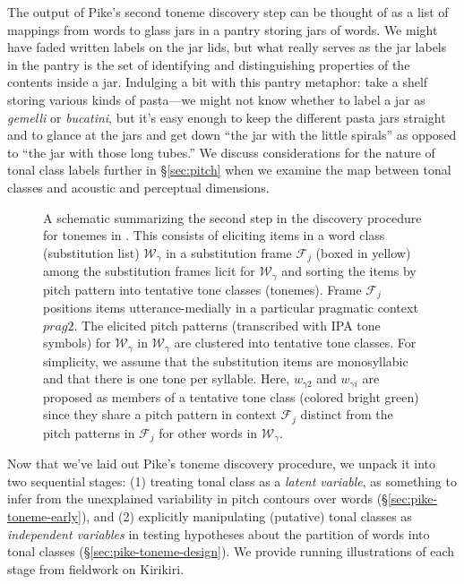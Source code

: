 \documentclass[12pt]{article}
\begin{document}
The output of Pike's second toneme discovery step can be thought of as
a list of mappings from words to glass jars in a pantry storing jars of words. We
might have faded written labels on the jar lids, but what really
serves as the jar labels in the pantry is the set of identifying and
distinguishing properties of the contents inside a jar. Indulging a
bit with this pantry metaphor: take a shelf storing various kinds of
pasta---we might not know whether to label a jar as \textit{gemelli} or
\textit{bucatini}, but it's easy enough to keep the different pasta
jars straight and to glance at the jars and get down ``the jar with the little
spirals'' as opposed to ``the jar with those long tubes.'' We discuss
considerations for the nature of tonal class labels further in
\S\ref{sec:pitch} when we examine the map between tonal classes and
acoustic and perceptual dimensions. 


\begin{figure}
  \centering
  \caption{A schematic summarizing the second step in the discovery
    procedure for tonemes in \citet[Ch.\ 4]{Pike:1948}. This consists
    of eliciting items
    in a word class (substitution list) $\mathcal{W}_{\gamma}$ in a
    substitution frame $\mathcal{F}_j$ (boxed in yellow) among the
    substitution frames licit for $\mathcal{W}_{\gamma}$ and sorting the items by pitch
    pattern into tentative tone classes (tonemes). Frame
    $\mathcal{F}_j$ positions items utterance-medially in a particular
    pragmatic context $prag2$. The elicited pitch patterns (transcribed with
    IPA tone symbols) for
    $\mathcal{W}_{\gamma}$ in $\mathcal{W}_{\gamma}$ are clustered
    into tentative tone classes. For simplicity, we assume that the
    substitution items are monosyllabic and that there is one tone per
    syllable. Here, $w_{\gamma
      2}$ and $w_{\gamma i}$ are proposed as members of a tentative
    tone class (colored bright green)
    since they share a pitch pattern in context $\mathcal{F}_j$
    distinct from the pitch patterns in $\mathcal{F}_j$ for other words in $\mathcal{W}_{\gamma}$.}
  \label{fig:sub-tikz}
\end{figure}

Now that we've laid out Pike's toneme discovery procedure, we
unpack it into two sequential stages: (1) treating tonal class as a
\textit{latent variable}, as something to infer from the unexplained
variability in pitch contours over words (\S\ref{sec:pike-toneme-early}), and (2) explicitly manipulating
(putative) tonal classes as \textit{independent variables} in testing
hypotheses about the partition of words into tonal classes
(\S\ref{sec:pike-toneme-design}). We provide running illustrations of
each stage from fieldwork on Kirikiri.
\end{document}
